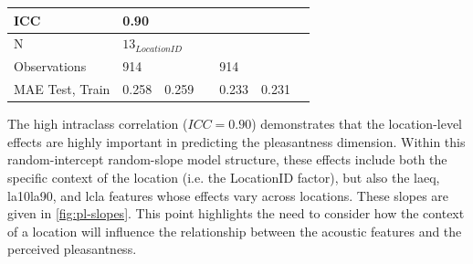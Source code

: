 \begin{table}[h!]
\begin{tabular}{@{}l|lccccc@{}}
    ICC                                      &
    0.90                                     &
    \multicolumn{1}{l}{}                     &
    \multicolumn{1}{l}{}                     &
    \multicolumn{1}{l}{}                     &
    \multicolumn{1}{l}{}                     &
    \multicolumn{1}{l}{}                                                                                                                                                                               \\ \midrule
    N                                        & \multicolumn{6}{l}{$13_{LocationID}$}                                                                                                                   \\
    Observations                             &
    914                                      &
    \multicolumn{1}{l}{}                     &
    \multicolumn{1}{l}{}                     &
    \multicolumn{1}{l}{914}                  &
    \multicolumn{1}{l}{}                     &
    \multicolumn{1}{l}{}                                                                                                                                                                               \\

    MAE Test, Train                          &
    0.258                                    &
    0.259                                    &
                                             &
    \multicolumn{1}{l}{0.233}                &
    0.231                                                                                                                                                                                              \\

    \bottomrule
  \end{tabular}
\end{table}

   The high intraclass correlation ($ICC=0.90$) demonstrates that the location-level effects are highly important in predicting the pleasantness dimension. Within this random-intercept random-slope model structure, these effects include both the specific context of the location (i.e. the LocationID factor), but also the \gls{laeq}, \gls{la10la90}, and \gls{lcla} features whose effects vary across locations. These slopes are given in \cref{fig:pl-slopes}. This point highlights the need to consider how the context of a location will influence the relationship between the acoustic features and the perceived pleasantness.

